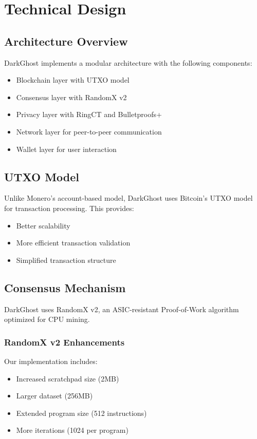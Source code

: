 \documentclass[11pt]{article}
\begin{document}
\section{Technical Design}
\subsection{Architecture Overview}
DarkGhost implements a modular architecture with the following components:
\begin{itemize}
    \item Blockchain layer with UTXO model
    \item Consensus layer with RandomX v2
    \item Privacy layer with RingCT and Bulletproofs+
    \item Network layer for peer-to-peer communication
    \item Wallet layer for user interaction
\end{itemize}

\subsection{UTXO Model}
Unlike Monero's account-based model, DarkGhost uses Bitcoin's UTXO model for transaction processing. This provides:
\begin{itemize}
    \item Better scalability
    \item More efficient transaction validation
    \item Simplified transaction structure
\end{itemize}

\subsection{Consensus Mechanism}
DarkGhost uses RandomX v2, an ASIC-resistant Proof-of-Work algorithm optimized for CPU mining.

\subsubsection{RandomX v2 Enhancements}
Our implementation includes:
\begin{itemize}
    \item Increased scratchpad size (2MB)
    \item Larger dataset (256MB)
    \item Extended program size (512 instructions)
    \item More iterations (1024 per program)
\end{itemize}
\end{document}
